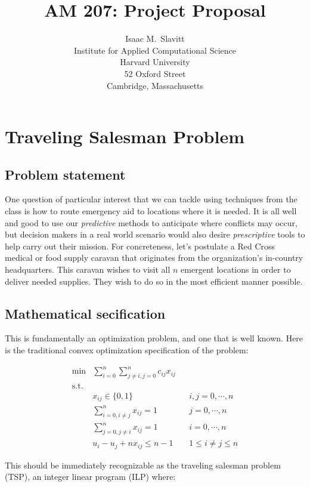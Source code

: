 \documentclass{article} %
\title{AM 207: Project Proposal}
\author{Isaac M.~Slavitt\\
Institute for Applied Computational Science\\
Harvard University\\
52 Oxford Street\\
Cambridge, Massachusetts}
\begin{document}
 
 
\maketitle 

\section*{Traveling Salesman Problem}

\subsection*{Problem statement}

One question of particular interest that we can tackle using techniques from the class is how to route emergency aid
to locations where it is needed.  It is all well and good to use our \emph{predictive} methods to anticipate where
conflicts may occur, but decision makers in a real world scenario would also desire \emph{prescriptive} tools to help
carry out their mission. For concreteness, let's postulate a Red Cross medical or food supply caravan that originates
from the organization's in-country headquarters. This caravan wishes to visit all $n$ emergent locations in order to
deliver needed supplies. They wish to do so in the most efficient manner possible.

\subsection*{Mathematical secification}

This is fundamentally an optimization problem, and one that is well known. Here is the traditional convex optimization
specification of the problem:

\begin{align*}
\min &\sum_{i=0}^n \sum_{j\ne i,j=0}^nc_{ij}x_{ij} &&  \\
\mathrm{s.t.} & \\
	& x_{ij} \in \{0, 1\} && i,j=0, \cdots, n \\
	& \sum_{i=0,i\ne j}^n x_{ij} = 1 && j=0, \cdots, n \\
	& \sum_{j=0,j\ne i}^n x_{ij} = 1 && i=0, \cdots, n \\
	&u_i-u_j +nx_{ij} \le n-1 && 1 \le i \ne j \le n
\end{align*}

This should be immediately recognizable as the traveling salesman problem (TSP), an integer linear program (ILP) where:
\end{document}
